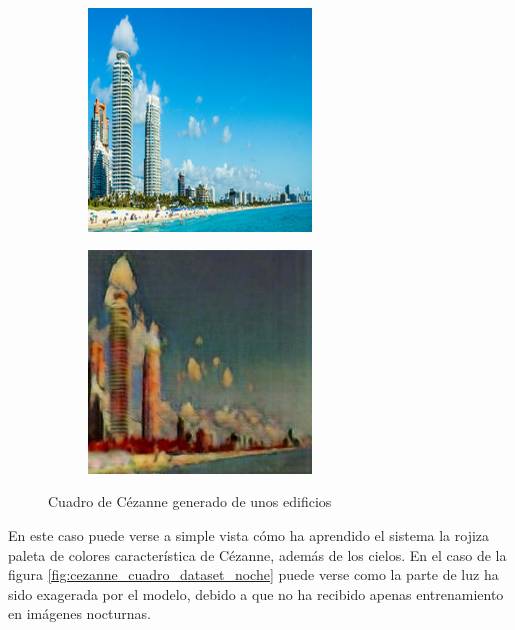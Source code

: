 \documentclass[[../main.tex]{subfiles}
\begin{document}
        \begin{figure}[!htb]
            \begin{subfigure}[b]{0.49\textwidth}
            \includegraphics[width=0.65\textwidth]{imagenes/imagen2cuadro/dataset/cezanne/2015-04-06 20_32_26.jpg}
            \end{subfigure}
        \hfill
            \begin{subfigure}[b]{0.49\textwidth}
            \includegraphics[width=0.65\textwidth]{imagenes/imagen2cuadro/dataset/cezanne/2015-04-06 20_32_26_2.jpg}
            \end{subfigure}
        \caption{Cuadro de Cézanne generado de unos edificios}
        \label{fig:cezanne_cuadro_dataset_edificios}
        \end{figure}
        
        En este caso puede verse a simple vista cómo ha aprendido el sistema la rojiza paleta de colores característica de Cézanne, además de los cielos. En el caso de la figura \ref{fig:cezanne_cuadro_dataset_noche} puede verse como la parte de luz ha sido exagerada por el modelo, debido a que no ha recibido apenas entrenamiento en imágenes nocturnas.
        
\end{document}
